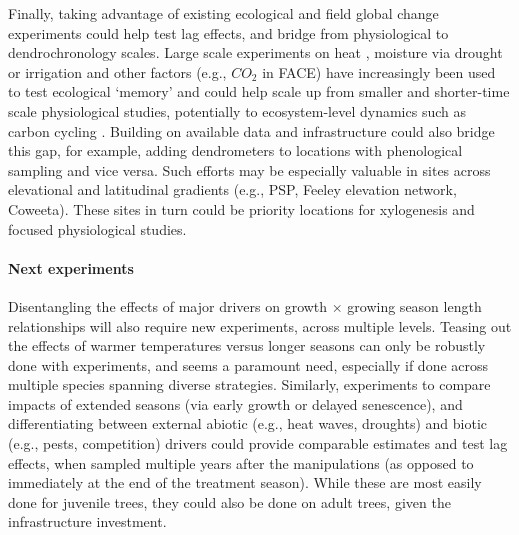 \documentclass[11pt]{article}
\begin{document}
Finally, taking advantage of existing ecological and field global change experiments could help test lag effects, and bridge from physiological to dendrochronology scales. Large scale experiments on heat \citep[e.g., SPRUCE,][]{hanson2017attaining}, moisture via drought or irrigation \citep[e.g., DroughtNet, Phynwald][]{smith2016drought} and other factors (e.g., $CO_2$ in FACE) have increasingly been used to test ecological `memory' \citep[e.g., ][]{flinker2021promise, schweiger2022transgenerational} and could help scale up from smaller and shorter-time scale physiological studies, potentially to ecosystem-level dynamics such as carbon cycling \citep{ding2021plant, jensen2019simulated}. Building on available data and infrastructure could also bridge this gap, for example, adding dendrometers to locations with phenological sampling and vice versa. Such efforts may be especially valuable in sites across elevational and latitudinal gradients (e.g., PSP, Feeley elevation network, Coweeta). These sites in turn could be priority locations for xylogenesis and focused physiological studies. 

\paragraph{Next experiments}

Disentangling the effects of major drivers on growth $\times$ growing season length relationships will also require new experiments, across multiple levels. Teasing out the effects of warmer temperatures versus longer seasons can only be robustly done with experiments, and seems a paramount need, especially if done across multiple species spanning diverse strategies. Similarly, experiments to compare impacts of extended seasons (via early growth or delayed senescence), and differentiating between external abiotic (e.g., heat waves, droughts) and biotic (e.g., pests, competition) drivers could provide comparable estimates and test lag effects, when sampled multiple years after the manipulations (as opposed to immediately at the end of the treatment season). While these are most easily done for juvenile trees, they could also be done on adult trees, given the infrastructure investment. %
\end{document}
